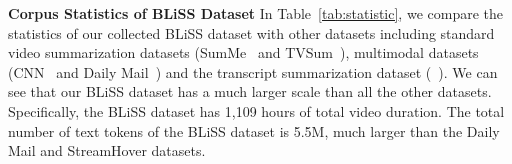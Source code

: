 \vspace{0.05in} 
\noindent\textbf{Corpus Statistics of BLiSS Dataset}
In Table~\ref{tab:statistic}, we compare the statistics of our collected BLiSS dataset with other datasets including standard video summarization datasets (SumMe~\cite{gygli2014creating} and TVSum~\cite{song2015tvsum}), multimodal datasets (CNN~\cite{fu2021mm} and Daily Mail~\cite{fu2021mm}) and the transcript summarization dataset (~\cite{cho2021streamhover}).
We can see that our BLiSS dataset has a much larger scale than all the other datasets. 
Specifically, the BLiSS dataset has 1,109 hours of total video duration. 
The total number of text tokens of the BLiSS dataset is 5.5M, much larger than the Daily Mail and StreamHover datasets.

\begin{table*}[t]
\centering
\caption{Statistics comparison of BLiSS dataset with other datasets.}
\label{tab:statistic}
\end{table*}



